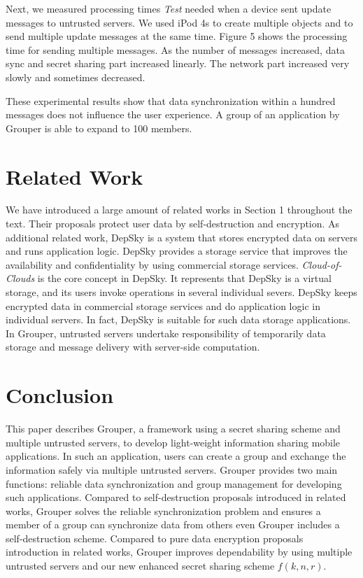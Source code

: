 \documentclass[twocolumn,10pt]{article}
\begin{document}
Next, we measured processing times \emph{Test} needed when a device sent update messages to untrusted servers.
We used iPod 4s to create multiple objects and to send multiple update messages at the same time.
Figure 5 shows the processing time for sending multiple messages. 
As the number of messages increased, data sync and secret sharing part increased linearly. 
The network part increased very slowly and sometimes decreased.

These experimental results show that data synchronization within a hundred messages does not influence the user experience. 
A group of an application by Grouper is able to expand to 100 members. 

\section{Related Work}

We have introduced a large amount of related works in Section 1 throughout the text. 
Their proposals protect user data by self-destruction and encryption.
As additional related work, DepSky\cite{bessani2013depsky} is a system that stores encrypted data on servers and runs application logic. 
DepSky provides a storage service that improves the availability and confidentiality by using commercial storage services. 
\emph{Cloud-of-Clouds} is the core concept in DepSky. 
It represents that DepSky is a virtual storage, and its users invoke operations in several individual severs. 
DepSky keeps encrypted data in commercial storage services and do application logic in individual servers.
In fact, DepSky is suitable for such data storage applications. 
In Grouper, untrusted servers undertake responsibility of temporarily data storage and message delivery with server-side computation.

\section{Conclusion}

This paper describes Grouper, a framework using a secret sharing scheme and multiple untrusted servers, to develop light-weight information sharing mobile applications.
In such an application, users can create a group and exchange the information safely via multiple untrusted servers.
Grouper provides two main functions: reliable data synchronization and group management for developing such applications.
Compared to self-destruction proposals introduced in related works, Grouper solves the reliable synchronization problem and ensures a member of a group can synchronize data from others even Grouper includes a self-destruction scheme.
Compared to pure data encryption proposals introduction in related works, Grouper improves dependability by using multiple untrusted servers and our new enhanced secret sharing scheme $f(k, n, r)$.
\end{document}
